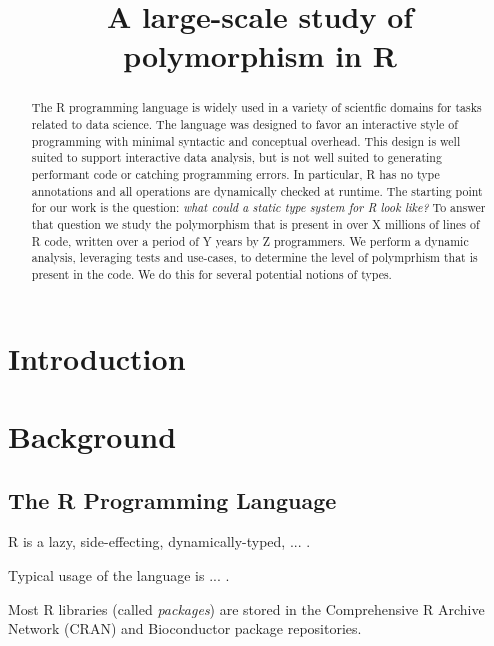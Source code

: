 \documentclass[acmsmall,10pt,review,anonymous]{acmart}\settopmatter{printfolios=true,printccs=false,printacmref=false}
\begin{document}
\title{A large-scale study of polymorphism in R}

\begin{abstract}
The R programming language is widely used in a variety of scientfic domains
for tasks related to data science. The language was designed to favor an
interactive style of programming with minimal syntactic and conceptual
overhead. This design is well suited to support interactive data analysis,
but is not well suited to generating performant code or catching programming
errors.  In particular, R has no type annotations and all operations are
dynamically checked at runtime. The starting point for our work is the
question: \emph{what could a static type system for R look like?}  To answer
that question we study the polymorphism that is present in over X millions
of lines of R code, written over a period of Y years by Z programmers.  We
perform a dynamic analysis, leveraging tests and use-cases, to determine the
level of polymprhism that is present in the code. We do this for several
potential notions of types.
\end{abstract}
\maketitle

\section{Introduction}


%
%
%
\section{Background}

%
%
%
%
\subsection{The R Programming Language}

R is a lazy, side-effecting, dynamically-typed, ... .

Typical usage of the language is ... . 

Most R libraries (called \textit{packages}) are stored in the Comprehensive R Archive Network (CRAN) and Bioconductor package repositories.
\end{document}
